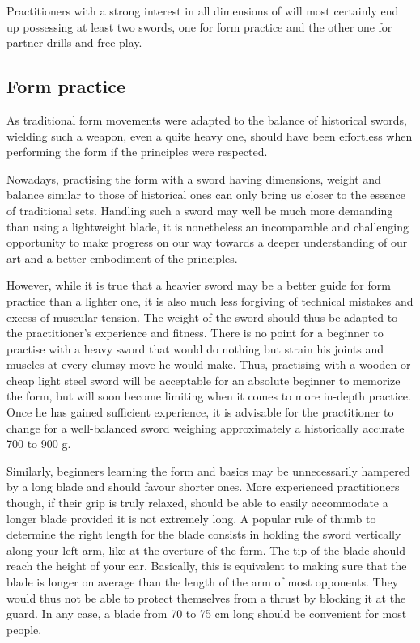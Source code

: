 Practitioners with a strong interest in all dimensions of \Taijijian{} will most certainly end up possessing at least two swords, one for form practice and the other one for partner drills and free play. 

\subsection{Form practice}
As traditional form movements were adapted to the balance of historical swords, wielding such a weapon, even a quite heavy one, should have been effortless when performing the form if the \Taiji{} principles were respected. 

Nowadays, practising the form with a sword having dimensions, weight and balance similar to those of historical ones can only bring us closer to the essence of traditional sets.
Handling such a sword may well be much more demanding than using a lightweight blade, it is nonetheless an incomparable and challenging opportunity to make progress on our way towards a deeper understanding of our art and a better embodiment of the \Taiji{} principles.

However, while it is true that a heavier sword may be a better guide for form practice than a lighter one, it is also much less forgiving of technical mistakes and excess of muscular tension.
The weight of the sword should thus be adapted to the practitioner's experience and fitness. There is no point for a beginner to practise with a heavy sword that would do nothing but strain his joints and muscles at every clumsy move he would make. 
Thus, practising with a wooden or cheap light steel sword will be acceptable for an absolute beginner to memorize the form, but will soon become limiting when it comes to more in-depth practice.
Once he has gained sufficient experience, it is advisable for the practitioner to change for a well-balanced sword weighing approximately a historically accurate 700 to 900 g.

Similarly, beginners learning the form and basics may be unnecessarily hampered by a long blade and should favour shorter ones. More experienced practitioners though, if their grip is truly relaxed, should be able to easily accommodate a longer blade provided it is not extremely long.
A popular rule of thumb to determine the right length for the blade consists in holding the sword vertically along your left arm, like at the overture of the form. The tip of the blade should reach the height of your ear. Basically, this is equivalent to making sure that the blade is longer on average than the length of the arm of most opponents. They would thus not be able to protect themselves from a thrust by blocking it at the guard. 
In any case, a blade from 70 to 75 cm long should be convenient for most people. 

